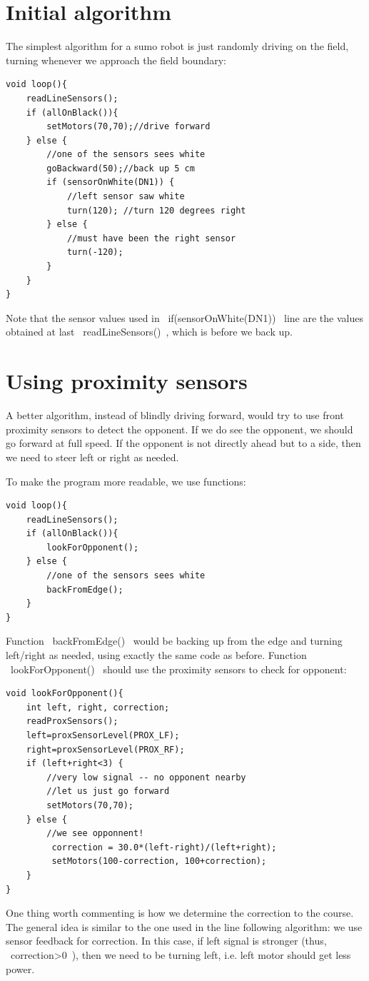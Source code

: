 \documentclass[oneside]{stml-l}
\numberwithin{figure}{chapter}
\begin{document}
\section{Initial algorithm}
The simplest algorithm for a sumo robot is just randomly driving on the 
field, turning whenever we approach the field boundary:


\begin{lstlisting}
void loop(){
    readLineSensors();
    if (allOnBlack()){
        setMotors(70,70);//drive forward
    } else {
        //one of the sensors sees white
        goBackward(50);//back up 5 cm
        if (sensorOnWhite(DN1)) {
            //left sensor saw white
            turn(120); //turn 120 degrees right
        } else {
            //must have been the right sensor
            turn(-120);
        }
    }
}
\end{lstlisting}

Note that the sensor values used in ~if(sensorOnWhite(DN1))~ line are the values 
obtained at  last ~readLineSensors()~, which is before we back up. 


\section{Using proximity sensors}
A better algorithm, instead of blindly driving forward, would try to use 
front proximity sensors to detect the opponent. If we do see the opponent, 
we should go forward at full speed. If the opponent is not directly ahead 
but to a side, then we need to steer left or right as needed.

To make the program more readable, we use functions:

\begin{lstlisting}
void loop(){
    readLineSensors();
    if (allOnBlack()){
        lookForOpponent();
    } else {
        //one of the sensors sees white
        backFromEdge();
    }
}
\end{lstlisting}

Function ~backFromEdge()~ would be backing up from the edge and turning 
left/right as needed, using exactly the same code as before. Function
 ~lookForOpponent()~ should use the proximity sensors to check for opponent: 
\begin{lstlisting}
void lookForOpponent(){
    int left, right, correction;
    readProxSensors();
    left=proxSensorLevel(PROX_LF);
    right=proxSensorLevel(PROX_RF);
    if (left+right<3) {
        //very low signal -- no opponent nearby
        //let us just go forward 
        setMotors(70,70);
    } else {
        //we see opponnent!
         correction = 30.0*(left-right)/(left+right);
         setMotors(100-correction, 100+correction);
    }
}
\end{lstlisting}
One thing  worth commenting is how we determine the 
correction to the course. The general idea is similar to the one used 
in the line following algorithm: we use sensor feedback for correction. 
In this case, if left signal is stronger (thus, ~correction>0~), then 
we need to be turning left, i.e. left motor should get less power. 
\end{document}
